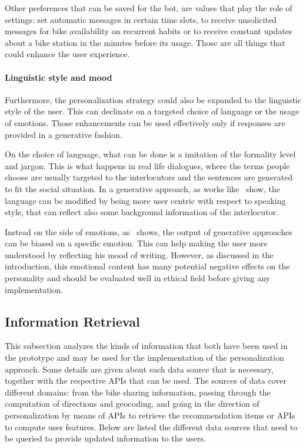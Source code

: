 Other preferences that can be saved for the bot, are values that play the role of settings: set automatic messages in certain time slots, to receive unsolicited messages for bike availability on recurrent habits or to receive constant updates about a bike station in the minutes before its usage. Those are all things that could enhance the user experience.

\paragraph{Linguistic style and mood}
Furthermore, the personalization strategy could also be expanded to the linguistic style of the user. This can declinate on a targeted choice of language or the usage of emotions. Those enhancements can be used effectively only if responses are provided in a generative fashion.

On the choice of language, what can be done is a imitation of the formality level and jargon. This is what happens in real life dialogues, where the terms people choose are usually targeted to the interlocutors and the sentences are generated to fit the social situation. In a generative approach, as works like~\cite{li2016persona} show, the language can be modified by being more user centric with respect to speaking style, that can reflect also some background information of the interlocutor.

Instead on the side of emotions, as~\cite{zhou2017emotional} shows, the output of generative approaches can be biased on a specific emotion. This can help making the user more understood by reflecting his mood of writing. However, as discussed in the introduction, this emotional content has many potential negative effects on the personality and should be evaluated well in ethical field before giving any implementation.

\subsection{Information Retrieval}
\label{approachIR}

This subsection analyzes the kinds of information that both have been used in the prototype and may be used for the implementation of the personalization approach. Some details are given about each data source that is necessary, together with the respective APIs that can be used. The sources of data cover different domains: from the bike sharing information, passing through the computation of directions and geocoding, and going in the direction of personalization by means of APIs to retrieve the recommendation items or APIs to compute user features. Below are listed the different data sources that need to be queried to provide updated information to the users.

